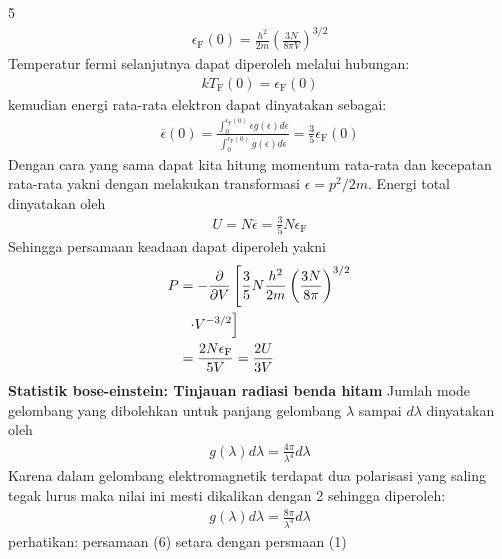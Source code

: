 \documentclass[a4paper  , 6 pt]{article}
\begin{document}
\begin{tiny}
\begin{multicols} {5}
\begin{align}
\epsilon_\mathrm{F} (0)= \frac{h^2}{2m }\left(\frac{3N}{8 \pi V}\right)^{3/2}
\end{align}
Temperatur fermi selanjutnya dapat diperoleh melalui hubungan:
\begin{align}
kT_\mathrm{F}(0) =  \epsilon_\mathrm{F} (0)
\end{align}
kemudian energi rata-rata elektron dapat dinyatakan sebagai:
\begin{align}
\overline{\epsilon} (0) = \frac{\int_{0}^{{\epsilon_\mathrm{F}(0)}}\epsilon g(\epsilon) d \epsilon}{\int_{0}^{{\epsilon_\mathrm{F}(0)}} g(\epsilon) d \epsilon} = \frac{3}{5} \epsilon_\mathrm{F} (0) 
\end{align}
Dengan cara yang sama dapat kita hitung momentum rata-rata dan kecepatan rata-rata yakni dengan melakukan transformasi $\epsilon = p^2/2m$. 
Energi total dinyatakan oleh
\begin{align}
U = N \overline{\epsilon } = \frac{3}{5} N \epsilon_\mathrm{F}
\end{align}
Sehingga persamaan keadaan dapat diperoleh yakni
\begin{align}
P & = - \frac{\partial }{\partial V} \left[ \frac{3}{5} N \frac{h^2}{2m} \left( \frac{3N}{8 \pi }\right)^{3/2} \right. \nonumber \\
& \hspace{0.2 cm } \left. \cdot V^{-3/2}  \right ] \nonumber \\
& = \frac{2 N \epsilon_\mathrm{F}}{5 V} = \frac{2 U}{3 V} \label{pers.keadaan fermi dirac}
\end{align} 
\textbf{Statistik bose-einstein: Tinjauan radiasi benda hitam} 
\newline
Jumlah mode gelombang yang dibolehkan untuk panjang gelombang $\lambda$ sampai $d \lambda$ dinyatakan oleh
\begin{align}
g(\lambda) d \lambda = \frac{4 \pi}{\lambda^4} d \lambda \label{persamaan gelombang em}
\end{align}
Karena dalam gelombang elektromagnetik terdapat dua polarisasi yang saling tegak lurus maka nilai ini mesti dikalikan dengan 2 sehingga diperoleh:
\begin{align}
g(\lambda) d \lambda = \frac{8 \pi}{\lambda^4} d \lambda 
\end{align}
perhatikan: persamaan (6) setara dengan persmaan (1)

\end{multicols}
\end{tiny}
\end{document}

